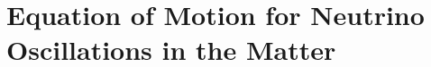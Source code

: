 





\section{\label{chap:matter-sec:background}Equation of Motion for Neutrino Oscillations in the Matter}


